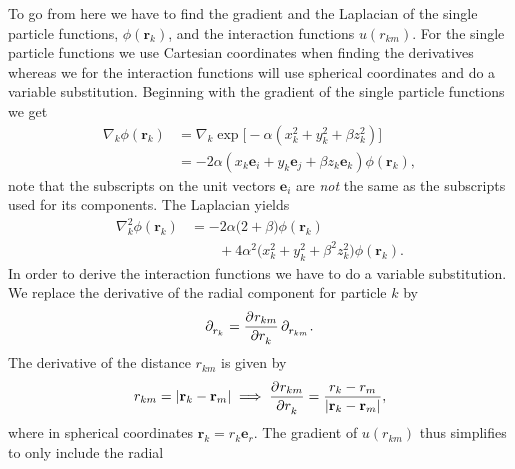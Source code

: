 \documentclass[
    a4paper, aps, twocolumn, floatfix, superscriptaddress]{revtex4-1}
\newcommand{\vf}{\mathbf}
\newcommand{\1}{\mathds{1}}
\newcommand{\tpl}[1]{\tensor{\partial}{_#1}} %
\begin{document}
            To go from here we have to find the gradient and the Laplacian of
            the single particle functions, $\phi(\vf{r}_k)$, and the interaction
            functions $u(r_{km})$. For the single particle functions we use
            Cartesian coordinates when finding the derivatives whereas we for
            the interaction functions will use spherical coordinates and do a
            variable substitution. Beginning with the gradient of the single
            particle functions we get
            \begin{align}
                \nabla_k\phi(\vf{r}_k)
                &=
                \nabla_k\exp\bigl[
                    -\alpha(x_k^2 + y_k^2 + \beta z_k^2)
                \bigr] \\
                &=
                -2\alpha
                (x_k\vf{e}_i + y_k\vf{e}_j + \beta z_k\vf{e}_k)
                \phi(\vf{r}_k),
            \end{align}
            note that the subscripts on the unit vectors $\vf{e}_i$ are
            \textit{not} the same as the subscripts used for its components. The
            Laplacian yields
            \begin{align}
                \nabla_k^2\phi(\vf{r}_k)
                &=
                -2\alpha
                \big(
                    2 + \beta
                \bigr)
                \phi(\vf{r}_k)
                \nonumber \\
                &\qquad
                + 4\alpha^2
                \bigl(
                    x_k^2 + y_k^2 + \beta^2z_k^2
                \bigr)
                \phi(\vf{r}_k).
            \end{align}
            In order to derive the interaction functions we have to do a
            variable substitution. We replace the derivative of the radial
            component for particle $k$ by
            \begin{align}
                \tpl{{r_k}}
                = \dpd[]{r_{km}}{r_k}\tpl{{r_{km}}}.
            \end{align}
            The derivative of the distance $r_{km}$ is given by
            \begin{gather}
                r_{km} = |\vf{r}_k - \vf{r}_m|
                \implies
                \dpd[]{r_{km}}{r_k}
                = \frac{r_k - r_m}{|\vf{r}_k - \vf{r}_m|},
            \end{gather}
            where in spherical coordinates $\vf{r}_k = r_k\vf{e}_r$.  The
            gradient of $u(r_{km})$ thus simplifies to only include the radial
\end{document}
